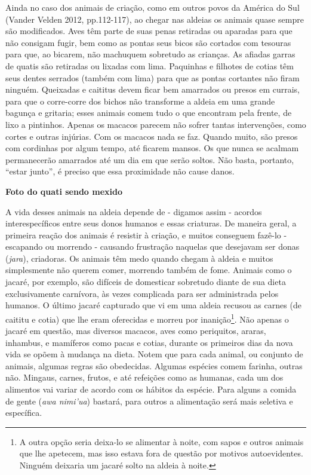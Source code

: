 Ainda no caso dos animais de criação, como em outros povos da América do
Sul (Vander Velden 2012, pp.112-117), ao chegar nas aldeias os animais
quase sempre são modificados. Aves têm parte de suas penas retiradas ou
aparadas para que não consigam fugir, bem como as pontas seus bicos são
cortados com tesouras para que, ao bicarem, não machuquem sobretudo as
crianças. As afiadas garras de quatis são retiradas ou lixadas com lima.
Paquinhas e filhotes de cotias têm seus dentes serrados (também com
lima) para que as pontas cortantes não firam ninguém. Queixadas e
caititus devem ficar bem amarrados ou presos em currais, para que o
corre-corre dos bichos não transforme a aldeia em uma grande bagunça e
gritaria; esses animais comem tudo o que encontram pela frente, de lixo
a pintinhos. Apenas os macacos parecem não sofrer tantas intervenções,
como cortes e outras injúrias. Com os macacos nada se faz. Quando muito,
são presos com cordinhas por algum tempo, até ficarem mansos. Os que
nunca se acalmam permanecerão amarrados até um dia em que serão soltos.
Não basta, portanto, ``estar junto'', é preciso que essa proximidade não
cause danos.

\textbf{Foto do quati sendo mexido}

A vida desses animais na aldeia depende de - digamos assim - acordos
interespecíficos entre seus donos humanos e essas criaturas. De maneira
geral, a primeira reação dos animais é resistir à criação, e muitos
conseguem fazê-lo - escapando ou morrendo - causando frustração naquelas
que desejavam ser donas (\emph{jara}), criadoras. Os animais têm medo
quando chegam à aldeia e muitos simplesmente não querem comer, morrendo
também de fome. Animais como o jacaré, por exemplo, são difíceis de
domesticar sobretudo diante de sua dieta exclusivamente carnívora, às
vezes complicada para ser administrada pelos humanos. O último jacaré
capturado que vi em uma aldeia recusou as carnes (de caititu e cotia)
que lhe eram oferecidas e morreu por inanição\footnote{A outra opção
  seria deixa-lo se alimentar à noite, com sapos e outros animais que
  lhe apetecem, mas isso estava fora de questão por motivos
  autoevidentes. Ninguém deixaria um jacaré solto na aldeia à noite.}.
Não apenas o jacaré em questão, mas diversos macacos, aves como
periquitos, araras, inhambus, e mamíferos como pacas e cotias, durante
os primeiros dias da nova vida se opõem à mudança na dieta. Notem que
para cada animal, ou conjunto de animais, algumas regras são obedecidas.
Algumas espécies comem farinha, outras não. Mingaus, carnes, frutos, e
até refeições como as humanas, cada um dos alimentos vai variar de
acordo com os hábitos da espécie. Para alguns a comida de gente
(\emph{awa nimi'ua}) bastará, para outros a alimentação será mais
seletiva e específica.

